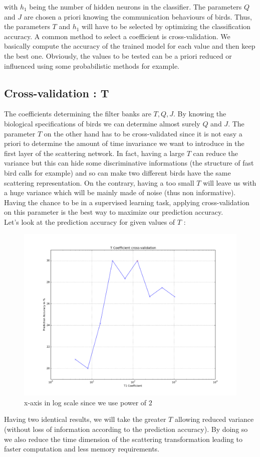 \documentclass[a4paper]{report}
\begin{document}
 with $h_1$ being the number of hidden neurons in the classifier.
The parameters $Q$ and $J$ are chosen a priori knowing the communication behaviours of birds. Thus, the parameters $T$ and $h_1$  will have to be selected by optimizing the classification accuracy. A common method to select a coefficient is cross-validation. We basically compute the accuracy of the trained model for each value and then keep the best one. Obviously, the values to be tested can be a priori reduced or influenced using some probabilistic methods for example.

\subsection{Cross-validation : T}
The coefficients determining the filter banks are $T, Q, J$. By knowing the biological specifications of birds we can determine almost surely $Q$ and $J$. The parameter $T$ on the other hand has to be cross-validated since it is not easy a priori to determine the amount of time invariance we want to introduce in the first layer of the scattering network. In fact, having a large $T$ can reduce the variance but this can hide some discriminative informations (the structure of fast bird calls for example) and so can make two different birds have the same scattering representation. On the contrary, having a too small $T$ will leave us with a huge variance which will be mainly made of noise (thus non informative). Having the chance to be in a supervised learning task, applying cross-validation on this parameter is the best way to maximize our prediction accuracy.\\
Let's look at the prediction accuracy for given values of $T$ :

\begin{figure}[H]
\begin{center}
\includegraphics[scale=0.25]{T_S0.png}\caption{x-axis in log scale since we use power of $2$}\label{figure4}
\end{center}
\end{figure}
Having two identical results, we will take the greater $T$ allowing reduced variance (without loss of information according to the prediction accuracy). By doing so we also reduce the time dimension of the scattering transformation leading to faster computation and less memory requirements. 
\end{document}
